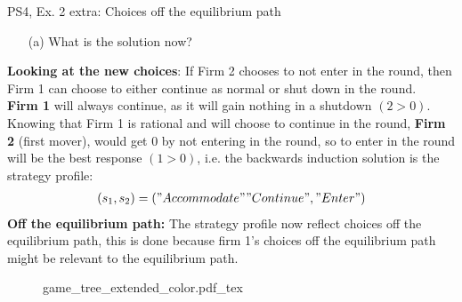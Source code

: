\begin{frame}{PS4, Ex. 2 extra: Choices off the equilibrium path}
  \begin{multicols}{2}
    \begin{itemize}
      \item[(a)] What is the solution now?
    \end{itemize}
    \textbf{Looking at the new choices}: If Firm 2 chooses to not enter in the  round, then Firm 1 can choose to either continue as normal or shut down in the  round.\\\medskip
    \textbf{Firm 1} will always continue, as it will gain nothing in a shutdown $(2>0)$.\\\medskip
    Knowing that Firm 1 is rational and will choose to continue in the  round, \textbf{Firm 2} (first mover), would get 0 by not entering in the  round, so to enter in the  round will be the best response $(1>0)$, i.e. the backwards induction solution is the strategy profile:
      \begin{align*}
        (s_1,s_2)=("Accommodate""Continue","Enter")
      \end{align*}
    \textbf{Off the equilibrium path:} The strategy profile now reflect choices off the equilibrium path, this is done because firm 1's choices off the equilibrium path might be relevant to the equilibrium path.
  \vfill\null \columnbreak
    \begin{figure}[!h]
      \begin{center}
      \def\svgwidth{1.0\columnwidth}
      {game_tree_extended_color.pdf_tex}
      \end{center}
    \end{figure}
  \vfill\null
  \end{multicols}
\end{frame}


